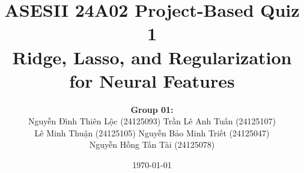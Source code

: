 \documentclass[11pt,a4paper]{article}
\title{%
    \textbf{ASESII 24A02 Project-Based Quiz 1} \\[6pt]
    \Large Ridge, Lasso, and Regularization for Neural Features%
}
\author{%
    \textbf{Group 01:} \\[4pt]
    Nguyễn Đình Thiên Lộc (24125093) \quad
    Trần Lê Anh Tuấn (24125107) \\[2pt]
    Lê Minh Thuận (24125105) \quad
    Nguyễn Bảo Minh Triết (24125047) \\[2pt]
    Nguyễn Hồng Tấn Tài (24125078)%
}
\date{\today}
\begin{document}
\maketitle
\begingroup
\tableofcontents
\endgroup
\newpage





\newpage


\newpage
\appendix

\end{document}
